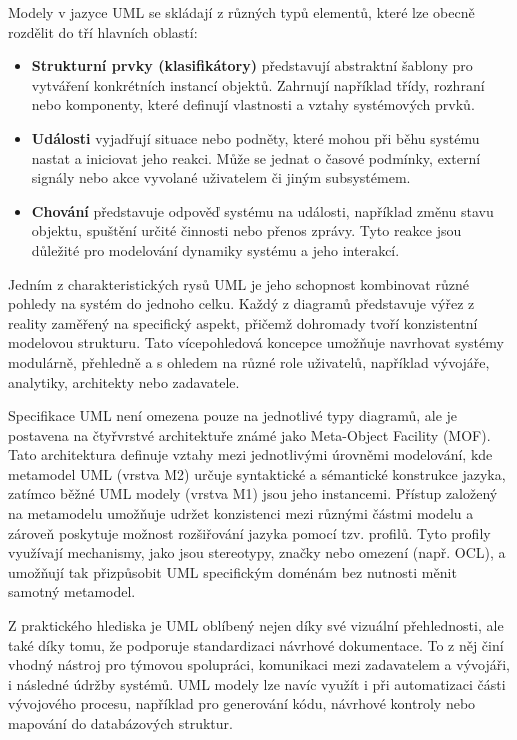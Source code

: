 Modely v jazyce UML se skládají z různých typů elementů, které lze obecně rozdělit do tří hlavních oblastí:
\begin{itemize}
  \item \textbf{Strukturní prvky (klasifikátory)} představují abstraktní šablony pro vytváření konkrétních instancí objektů. Zahrnují například třídy, rozhraní nebo komponenty, které definují vlastnosti a vztahy systémových prvků.
  \item \textbf{Události} vyjadřují situace nebo podněty, které mohou při běhu systému nastat a iniciovat jeho reakci. Může se jednat o časové podmínky, externí signály nebo akce vyvolané uživatelem či jiným subsystémem.
  \item \textbf{Chování} představuje odpověď systému na události, například změnu stavu objektu, spuštění určité činnosti nebo přenos zprávy. Tyto reakce jsou důležité pro modelování dynamiky systému a jeho interakcí. \cite{Selic2015models}
\end{itemize}
Jedním z charakteristických rysů UML je jeho schopnost kombinovat různé pohledy na systém do jednoho celku. Každý z diagramů představuje výřez z reality zaměřený na specifický aspekt, přičemž dohromady tvoří konzistentní modelovou strukturu. Tato vícepohledová koncepce umožňuje navrhovat systémy modulárně, přehledně a s ohledem na různé role uživatelů, například vývojáře, analytiky, architekty nebo zadavatele. \cite{Clark1997,Niziol2021}

Specifikace UML není omezena pouze na jednotlivé typy diagramů, ale je postavena na čtyřvrstvé architektuře známé jako Meta-Object Facility (MOF). Tato architektura definuje vztahy mezi jednotlivými úrovněmi modelování, kde metamodel UML (vrstva M2) určuje syntaktické a sémantické konstrukce jazyka, zatímco běžné UML modely (vrstva M1) jsou jeho instancemi. Přístup založený na metamodelu umožňuje udržet konzistenci mezi různými částmi modelu a zároveň poskytuje možnost rozšiřování jazyka pomocí tzv. profilů. Tyto profily využívají mechanismy, jako jsou stereotypy, značky nebo omezení (např. OCL), a umožňují tak přizpůsobit UML specifickým doménám bez nutnosti měnit samotný metamodel. \cite{Engels2000, iso_mof,Tang2009}

Z praktického hlediska je UML oblíbený nejen díky své vizuální přehlednosti, ale také díky tomu, že podporuje standardizaci návrhové dokumentace. To z něj činí vhodný nástroj pro týmovou spolupráci, komunikaci mezi zadavatelem a vývojáři, i následné údržby systémů. UML modely lze navíc využít i při automatizaci části vývojového procesu, například pro generování kódu, návrhové kontroly nebo mapování do databázových struktur. \cite{Engels2000}

